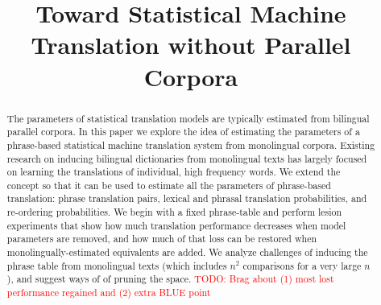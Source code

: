 \documentclass[11pt]{article}
\title{Toward Statistical Machine Translation without Parallel Corpora}
\author{}
\date{}
\newcommand{\todo}[1]{\textcolor{red}{TODO: #1}}
\begin{document}
\maketitle
\begin{abstract}
The parameters of statistical translation models are typically estimated from bilingual parallel corpora.   In this paper we explore the idea of estimating the parameters of a phrase-based statistical machine translation system from monolingual corpora.  Existing research on inducing bilingual dictionaries from monolingual texts has largely focused on learning the translations of individual, high frequency words.   We extend the concept so that it can be used to estimate all the parameters of phrase-based translation: phrase translation pairs, lexical and phrasal translation probabilities, and re-ordering probabilities.  We begin with a fixed phrase-table and perform lesion experiments that show how much translation performance decreases when model parameters are removed, and how much of that loss can be restored when monolingually-estimated equivalents are added.  We analyze challenges of  inducing the phrase table from monolingual texts (which includes $n^2$ comparisons for a very large $n$), and suggest ways of of pruning the space.
\todo{Brag about (1) most lost performance regained and (2) extra BLUE point}



\end{abstract}
\end{document}
